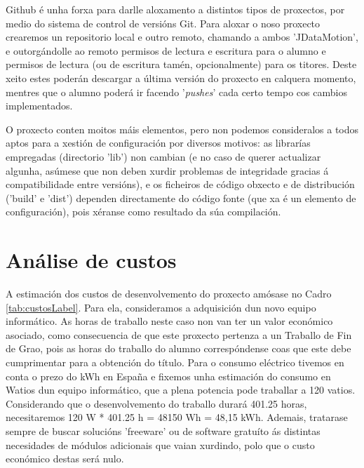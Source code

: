Github é unha forxa para darlle aloxamento a distintos tipos de proxectos, por medio do sistema de control de versións Git. Para aloxar o noso proxecto crearemos un repositorio local e outro remoto, chamando a ambos 'JDataMotion', e outorgándolle ao remoto permisos de lectura e escritura para o alumno e permisos de lectura (ou de escritura tamén, opcionalmente) para os titores. Deste xeito estes poderán descargar a última versión do proxecto en calquera momento, mentres que o alumno poderá ir facendo '{\it pushes}' cada certo tempo cos cambios implementados.

O proxecto conten moitos máis elementos, pero non podemos consideralos a todos aptos para a xestión de configuración por diversos motivos: as librarías empregadas (directorio 'lib') non cambian (e no caso de querer actualizar algunha, asúmese que non deben xurdir problemas de integridade gracias á compatibilidade entre versións), e os ficheiros de código obxecto e de distribución ('build' e 'dist') dependen directamente do código fonte (que xa é un elemento de configuración), pois xéranse como resultado da súa compilación.

\section{Análise de custos}

A estimación dos custos de desenvolvemento do proxecto amósase no Cadro \ref{tab:custosLabel}. Para ela, consideramos a adquisición dun novo equipo informático. As horas de traballo neste caso non van ter un valor económico asociado, como consecuencia de que este proxecto pertenza a un Traballo de Fin de Grao, pois as horas do traballo do alumno correspóndense coas que este debe cumprimentar para a obtención do título. Para o consumo eléctrico tivemos en conta o prezo do kWh en España\cite{preciokWh_espana} e fixemos unha estimación\cite{energyusecalculator} do consumo en Watios dun equipo informático, que a plena potencia pode traballar a 120 vatios. Considerando que o desenvolvemento  do traballo durará 401.25 horas, necesitaremos 120 W * 401.25 h = 48150 Wh = 48,15 kWh. Ademais, tratarase sempre de buscar solucións 'freeware' ou de software gratuíto ás distintas necesidades de módulos adicionais que vaian xurdindo, polo que o custo económico destas será nulo.

